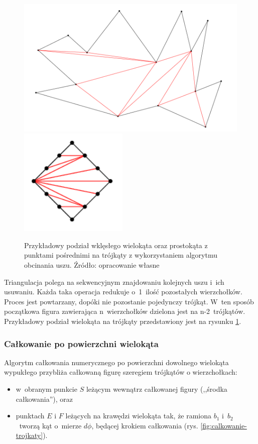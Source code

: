 \begin{figure}[ht]
	\centering
	\includegraphics[width=0.7\linewidth]{images/triangulacja-przyklad}
	\includegraphics[width=0.3\linewidth]{images/triangulacja-prostokat}
	\caption[Przykładowy podział wklęsłego wielokąta oraz prostokąta z punktami pośrednimi na trójkąty z wykorzystaniem algorytmu obcinania uszu]{Przykładowy podział wklęsłego wielokąta oraz prostokąta z punktami pośrednimi na trójkąty z wykorzystaniem algorytmu obcinania uszu. \newline Źródło: opracowanie własne}
	\label{fig:triangulacja-przyklad}
\end{figure}

Triangulacja polega na sekwencyjnym znajdowaniu kolejnych uszu i~ich usuwaniu. Każda taka operacja redukuje o~1~ilość pozostałych wierzchołków. Proces jest powtarzany, dopóki nie pozostanie pojedynczy trójkąt. W~ten sposób początkowa figura zawierająca n~wierzchołków dzielona jest na n-2~trójkątów. Przykładowy podział wielokąta na trójkąty przedstawiony jest na rysunku \ref{fig:triangulacja-przyklad}.

\subsubsection{Całkowanie po powierzchni wielokąta}
\label{part:calkapowielokacie}
Algorytm całkowania numerycznego po powierzchni dowolnego wielokąta wypukłego przybliża całkowaną figurę szeregiem trójkątów o wierzchołkach:
\begin{itemize}
	\item w~obranym punkcie $S$ leżącym wewnątrz całkowanej figury (,,środka całkowania''), oraz
	\item punktach $E$ i $F$ leżących na krawędzi wielokąta tak, że ramiona $b_1$ i~$b_2$~tworzą kąt o~mierze $d\phi$, będącej krokiem całkowania (rys. \ref{fig:calkowanie-trojkaty}).
\end{itemize}

